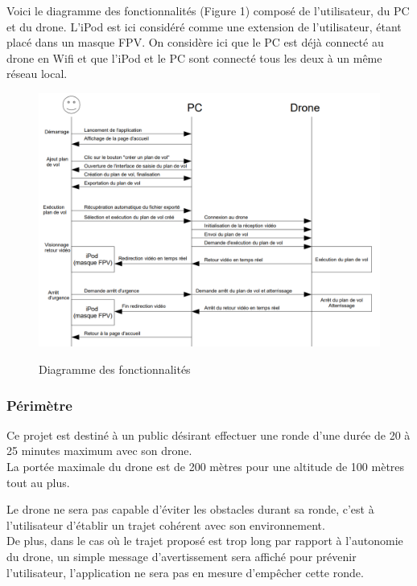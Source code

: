 \documentclass{article}
\begin{document}
	
	    Voici le diagramme des fonctionnalités (Figure 1) composé de l'utilisateur, du PC et du drone. L'iPod est ici considéré comme une extension de l'utilisateur, étant placé dans un masque FPV. On considère ici que le PC est déjà connecté au drone en Wifi et que l'iPod et le PC sont connecté tous les deux à un même réseau local.\\
	    
		\begin{center}
		\begin{figure}[!h]
		\includegraphics[scale=0.7]{corrige_diagramme_services.PNG}\\
		 \vspace*{0.3cm}
		\caption{Diagramme des fonctionnalités}
		\end{figure}
		\end{center}
		
		\newpage
			
\subsubsection{Périmètre}
		Ce projet est destiné à un public désirant effectuer une ronde d'une durée de 20 à 25 minutes maximum avec son drone.\\
		La portée maximale du drone est de 200 mètres pour une altitude de 100 mètres tout au plus.
	
		Le drone ne sera pas capable d'éviter les obstacles durant sa ronde, c'est à l'utilisateur d'établir un trajet cohérent avec son environnement.\\
		De plus, dans le cas où le trajet proposé est trop long par rapport à l'autonomie du drone, un simple message d'avertissement sera affiché pour prévenir l'utilisateur, l'application ne sera pas en mesure d'empêcher cette ronde.
	
\end{document}
